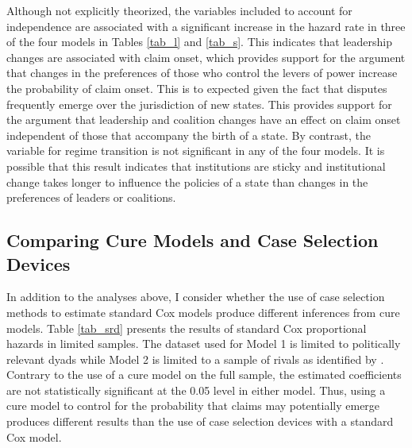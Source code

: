 


Although not explicitly theorized, the variables included to account for independence are associated with a significant increase in the hazard rate in three of the four models in Tables \ref{tab_l} and \ref{tab_s}. This indicates that leadership changes are associated with claim onset, which provides support for the argument that changes in the preferences of those who control the levers of power increase the probability of claim onset. This is to expected given the fact that disputes frequently emerge over the jurisdiction of new states. This provides support for the argument that leadership and coalition changes have an effect on claim onset independent of those that accompany the birth of a state. By contrast, the variable for regime transition is not significant in any of the four models. It is possible that this result indicates that institutions are sticky and institutional change takes longer to influence the policies of a state than changes in the preferences of leaders or coalitions.


\subsection{Comparing Cure Models and Case Selection Devices}
In addition to the analyses above, I consider whether the use of case selection methods to estimate standard Cox models produce different inferences from cure models. Table \ref{tab_srd} presents the results of standard Cox proportional hazards in limited samples. The dataset used for Model 1 is limited to politically relevant dyads while Model 2 is limited to a sample of rivals as identified by \citet{colaresi2007}. Contrary to the use of a cure model on the full sample, the estimated coefficients are not statistically significant at the 0.05 level in either model. Thus, using a cure model to control for the probability that claims may potentially emerge produces different results than the use of case selection devices with a standard Cox model.

